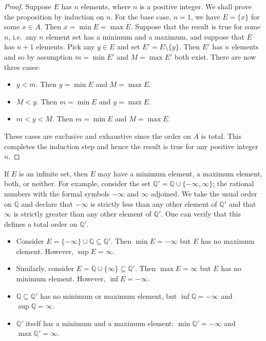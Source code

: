\documentclass[12pt]{article}
\theoremstyle{definition}
\begin{document}
\begin{proof}
    Suppose \( E \) has \( n \) elements, where \( n \) is a positive integer. We shall prove the proposition by induction on \( n \). For the base case, \( n = 1 \), we have \( E = \{ x \} \) for some \( x \in A \). Then \( x = \min E = \max E \). Suppose that the result is true for some \( n \), i.e.\ any \( n \) element set has a minimum and a maximum, and suppose that \( E \) has \( n + 1 \) elements. Pick any \( y \in E \) and set \( E' = E \setminus \{ y \} \). Then \( E' \) has \( n \) elements and so by assumption \( m = \min E' \) and \( M = \max E' \) both exist. There are now three cases:
    \begin{itemize}
        \item \( y < m \). Then \( y = \min E \) and \( M = \max E \).

        \item \( M < y \). Then \( m = \min E \) and \( y = \max E \).

        \item \( m < y < M \). Then \( m = \min E \) and \( M = \max E \).
    \end{itemize}

    These cases are exclusive and exhaustive since the order on \( A \) is total. This completes the induction step and hence the result is true for any positive integer \( n \).
\end{proof}

If \( E \) is an infinite set, then \( E \) may have a minimum element, a maximum element, both, or neither. For example, consider the set \( \mathbb{Q}' = \mathbb{Q} \cup \{ -\infty, \infty \} \); the rational numbers with the formal symbols \( -\infty \) and \( \infty \) adjoined. We take the usual order on \( \mathbb{Q} \) and declare that \( -\infty \) is strictly less than any other element of \( \mathbb{Q}' \) and that \( \infty \) is strictly greater than any other element of \( \mathbb{Q}' \). One can verify that this defines a total order on \( \mathbb{Q}' \).

\begin{itemize}
    \item Consider \( E = \{ -\infty \} \cup \mathbb{Q} \subseteq \mathbb{Q}' \). Then \( \min E = -\infty \) but \( E \) has no maximum element. However, \( \sup E = \infty \).

    \item Similarly, consider \( E = \mathbb{Q} \cup \{ \infty \} \subseteq \mathbb{Q}' \). Then \( \max E = \infty \) but \( E \) has no minimum element. However, \( \inf E = -\infty \).

    \item \( \mathbb{Q} \subseteq \mathbb{Q}' \) has no minimum or maximum element, but \( \inf \mathbb{Q} = -\infty \) and \( \sup \mathbb{Q} = \infty \).

    \item \( \mathbb{Q}' \) itself has a minimum and a maximum element: \( \min \mathbb{Q}' = -\infty \) and \( \max \mathbb{Q}' = \infty \).
\end{itemize}
 
\end{document}
